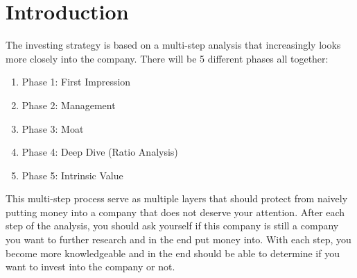 \section{Introduction}

The investing strategy is based on a multi-step analysis that increasingly looks
more closely into the company. There will be 5 different phases all together:

\begin{enumerate}
	\item Phase 1: First Impression
	\item Phase 2: Management
	\item Phase 3: Moat
	\item Phase 4: Deep Dive (Ratio Analysis)
	\item Phase 5: Intrinsic Value
\end{enumerate}

This multi-step process serve as multiple layers that should protect from naively putting
money into a company that does not deserve your attention. After each step of the
analysis, you should ask yourself if this company is still a company you want to
further research and in the end put money into. With each step, you become more
knowledgeable and in the end should be able to determine if you want to invest into the
company or not.

